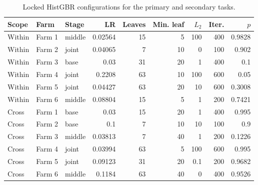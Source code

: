 \begin{table}[pos=t,width=\FullWidth]
\centering
\color{blue}
\caption{Locked HistGBR configurations for the primary and secondary tasks.}
\label{tab:selection-v2-histgbr-configs}
\small
\setlength{\tabcolsep}{3pt}
\begin{tabular}{lllrrrrrr}
\toprule
Scope & Farm & Stage & LR & Leaves & Min. leaf & $L_2$ & Iter. & $p$ \\
\midrule
Within & Farm 1 & middle & 0.02564 & 15 & 5 & 100 & 400 & 0.9828 \\
Within & Farm 2 & joint & 0.04065 & 7 & 10 & 0 & 100 & 0.902 \\
Within & Farm 3 & base & 0.03 & 31 & 20 & 1 & 400 & 0.1 \\
Within & Farm 4 & joint & 0.2208 & 63 & 10 & 100 & 600 & 0.05 \\
Within & Farm 5 & joint & 0.04427 & 63 & 20 & 10 & 600 & 0.3008 \\
Within & Farm 6 & middle & 0.08804 & 15 & 5 & 1 & 200 & 0.7421 \\
Cross & Farm 1 & base & 0.03 & 15 & 20 & 1 & 400 & 0.995 \\
Cross & Farm 2 & base & 0.1 & 7 & 10 & 10 & 100 & 0.9 \\
Cross & Farm 3 & middle & 0.03813 & 7 & 40 & 1 & 200 & 0.1226 \\
Cross & Farm 4 & joint & 0.03994 & 63 & 5 & 100 & 600 & 0.995 \\
Cross & Farm 5 & joint & 0.09123 & 31 & 20 & 0.1 & 200 & 0.9682 \\
Cross & Farm 6 & middle & 0.1184 & 63 & 40 & 0 & 400 & 0.9526 \\
\bottomrule
\end{tabular}
\end{table}
